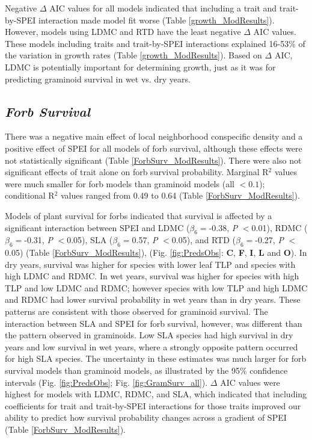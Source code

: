 \documentclass[12pt, letterpaper]{article}
\begin{document}
Negative $\Delta$ AIC values for all models indicated that including a trait and trait-by-SPEI interaction made model fit worse (Table \ref{growth_ModResults}). 
However, models using LDMC and RTD have the least negative $\Delta$ AIC values. These models including traits and trait-by-SPEI interactions explained 16-53\% of the variation in growth rates (Table \ref{growth_ModResults}). Based on $\Delta$ AIC, LDMC is potentially important for determining growth, just as it was for predicting graminoid survival in wet vs. dry years. 

\subsection{\textit{Forb Survival}} There was a negative main effect of local neighborhood conspecific density and a positive effect of SPEI for all models of forb survival, although these effects were not statistically significant (Table \ref{ForbSurv_ModResults}). There were also not significant effects of trait alone on forb survival probability. Marginal R$^2$ values were much smaller for forb models than graminoid models (all $<0.1$); conditional R$^2$ values ranged from 0.49 to 0.64 (Table \ref{ForbSurv_ModResults}).

Models of plant survival for forbs indicated that survival is affected by a significant interaction between SPEI and LDMC ($\beta_6=$-0.38,  \textit{P} $<$0.01), RDMC ($\beta _6=$-0.31,  \textit{P} $<$0.05), SLA ($\beta _6=$0.57,  \textit{P} $<$0.05), and RTD ($\beta _6=$-0.27,  \textit{P} $<$0.05) (Table \ref{ForbSurv_ModResults}), (Fig. \ref{fig:PredsObs}: \textbf{C}, \textbf{F}, \textbf{I}, \textbf{L} and \textbf{O}). In dry years, survival was higher for species with lower leaf TLP and species with high LDMC and RDMC. In wet years, survival was higher for species with high TLP and low LDMC and RDMC; however species with low TLP and high LDMC and RDMC had lower survival probability in wet years than in dry years. These patterns are consistent with those observed for graminoid survival. The interaction between SLA and SPEI for forb survival, however, was different than the pattern observed in graminoids. Low SLA species had high survival in dry years and low survival in wet years, where a strongly opposite pattern occurred for high SLA species. The  uncertainty in these estimates was much larger for forb survival models than graminoid models, as illustrated by the 95\% confidence intervals (Fig. \ref{fig:PredsObs}; Fig. \ref{fig:GramSurv_all}). $\Delta$ AIC values were highest for models with LDMC, RDMC, and SLA, which indicated that including coefficients for trait and trait-by-SPEI interactions for those traits improved our ability to predict how survival probability changes across a gradient of SPEI (Table \ref{ForbSurv_ModResults}). 
\end{document}
